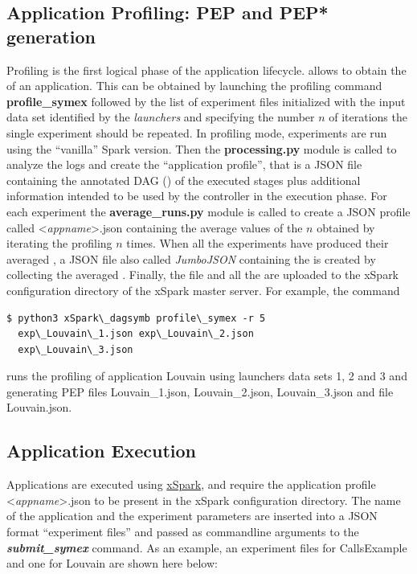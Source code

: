 \hypertarget{application-profiling}{%
\subsection{Application Profiling: PEP and PEP* generation}\label{application-profiling}}
Profiling is the first logical phase of the \tool application
lifecycle.  \tool allows to obtain the \model of an application. This can be obtained by launching the profiling command \textbf{profile\_symex} followed by the list of experiment files initialized with the input data set identified by the \dSymb \textit{launchers} and specifying the number $n$ of iterations the single experiment should be repeated. In profiling mode, experiments are run using the ``vanilla'' Spark version. Then the \textbf{processing.py} module is called to analyze the logs and create the ``application profile'', that is a JSON
file containing the annotated DAG (\plan) of the executed stages plus additional information intended to be used by the controller in the execution phase. For each experiment the  \textbf{average\_runs.py} module is called to create a JSON profile called  <\emph{appname}>.json containing the average values of the $n$ \plans obtained by iterating the 
profiling $n$ times. When all the experiments have produced their averaged \plan, a JSON file also called \textit{JumboJSON} containing the \model is created by collecting the averaged \plans. Finally, the \model file and all the \plans are uploaded to the xSpark configuration directory of the xSpark master server. For example, the command
\begin{verbatim} 
$ python3 xSpark\_dagsymb profile\_symex -r 5
  exp\_Louvain\_1.json exp\_Louvain\_2.json 
  exp\_Louvain\_3.json 
\end{verbatim}
runs the profiling of application Louvain using launchers data sets 1, 2 and 3 and generating PEP files Louvain\_1.json, Louvain\_2.json, Louvain\_3.json and \model file Louvain.json.

\hypertarget{application-execution}{%
\subsection{Application Execution}\label{application-execution}}
Applications are executed using
\href{https://github.com/gioenn/xSpark.git}{xSpark}, and require the
application profile <\emph{appname}>.json to be present in the
xSpark configuration directory. The name of the application and the experiment
parameters are inserted into a JSON format ``experiment files'' and passed as commandline
arguments to the \emph{\textbf{submit\_symex}} command. As an example, an
experiment files for CallsExample and one for Louvain are shown here below:


